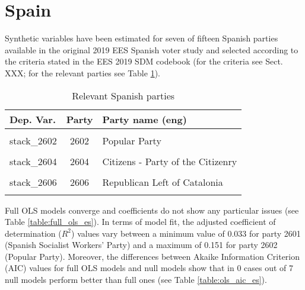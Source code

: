 \documentclass[
]{article}
\begin{document}
\clearpage

\newpage

\hypertarget{spain}{%
\section{Spain}\label{spain}}

Synthetic variables have been estimated for seven of fifteen Spanish parties available in the original
2019 EES Spanish voter study and selected according to the criteria stated in the EES 2019 SDM codebook (for the criteria see Sect. XXX; for the relevant parties see Table \ref{table:relprty_tab_es}).

\begin{table}[!h]

\caption{\label{tab:unnamed-chunk-170}Relevant Spanish parties \label{table:relprty_tab_es}}
\centering
\begin{tabular}[t]{lcl}
\toprule
Dep. Var. & Party & Party name (eng)\\
\midrule
\cellcolor{gray!6}{stack\_2601} & \cellcolor{gray!6}{2601} & \cellcolor{gray!6}{Spanish Socialist Workers' Party}\\
stack\_2602 & 2602 & Popular Party\\
\cellcolor{gray!6}{stack\_2603} & \cellcolor{gray!6}{2603} & \cellcolor{gray!6}{Podemos (We Can)}\\
stack\_2604 & 2604 & Citizens - Party of the Citizenry\\
\cellcolor{gray!6}{stack\_2605} & \cellcolor{gray!6}{2605} & \cellcolor{gray!6}{Voice}\\
\addlinespace
stack\_2606 & 2606 & Republican Left of Catalonia\\
\cellcolor{gray!6}{stack\_2609} & \cellcolor{gray!6}{2609} & \cellcolor{gray!6}{Commitment to Europe}\\
\bottomrule
\end{tabular}
\end{table}

Full OLS models converge and coefficients do not show any particular issues (see Table
\ref{table:full_ols_es}).
In terms of model fit, the adjusted coefficient of determination (\(R^2\)) values vary between
a minimum value of 0.033
for party 2601
(Spanish Socialist Workers' Party)
and a maximum of 0.151
for party 2602
(Popular Party).
Moreover, the differences between Akaike Information Criterion (AIC) values for full OLS models and null
models show that in 0 cases out of 7 null models perform better than full ones (see Table
\ref{table:ols_aic_es}).
\end{document}
